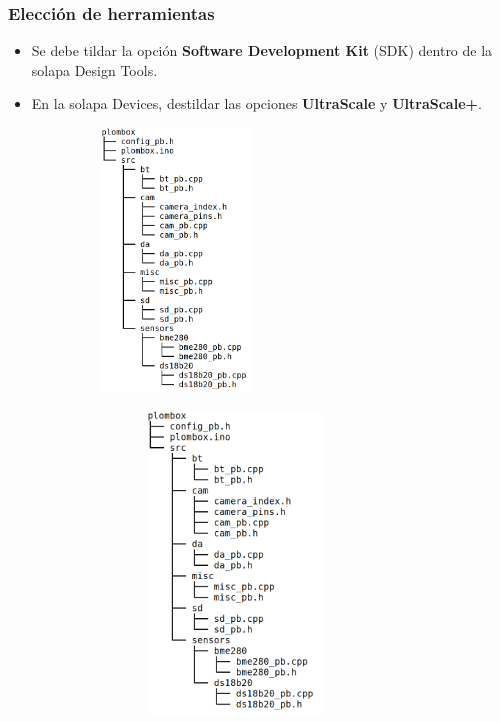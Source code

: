\documentclass[a4paper,11pt]{article}
\begin{document}
\subsubsection{Elección de herramientas}
    \begin{itemize}
      \item Se debe tildar la opción \textbf{Software Development Kit} (SDK)
dentro de la solapa Design Tools.
      \item En la solapa Devices, destildar las opciones \textbf{UltraScale} y
            \textbf{UltraScale+}.
    \end{itemize}
    \begin{center}
    \includegraphics[height=7cm,width=9cm]{tree_dir}
    \end{center}

    \begin{center}
    \includegraphics[height=8cm,width=12cm]{tree_dir}
    \end{center}
\end{document}
